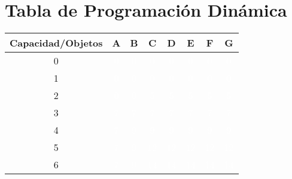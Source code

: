 \documentclass{article}
\begin{document}
\section*{Tabla de Programación Dinámica}
\begin{center}
\scriptsize
\begin{tabular}{|c|c|c|c|c|c|c|c|}
\hline
Capacidad/Objetos & A & B & C & D & E & F & G \\ \hline
0 & \cellcolor{rojo}\textcolor{white}{0} & \cellcolor{rojo}\textcolor{white}{0} & \cellcolor{rojo}\textcolor{white}{0} & \cellcolor{rojo}\textcolor{white}{0} & \cellcolor{rojo}\textcolor{white}{0} & \cellcolor{rojo}\textcolor{white}{0} & \cellcolor{rojo}\textcolor{white}{0} \\ \hline
1 & \cellcolor{rojo}\textcolor{white}{0} & \cellcolor{rojo}\textcolor{white}{0} & \cellcolor{rojo}\textcolor{white}{0} & \cellcolor{rojo}\textcolor{white}{0} & \cellcolor{rojo}\textcolor{white}{0} & \cellcolor{rojo}\textcolor{white}{0} & \cellcolor{rojo}\textcolor{white}{0} \\ \hline
2 & \cellcolor{rojo}\textcolor{white}{0} & \cellcolor{rojo}\textcolor{white}{0} & \cellcolor{verde}\textcolor{white}{5} & \cellcolor{rojo}\textcolor{white}{5} & \cellcolor{rojo}\textcolor{white}{5} & \cellcolor{rojo}\textcolor{white}{5} & \cellcolor{rojo}\textcolor{white}{5} \\ \hline
3 & \cellcolor{verde}\textcolor{white}{7} & \cellcolor{rojo}\textcolor{white}{7} & \cellcolor{rojo}\textcolor{white}{7} & \cellcolor{rojo}\textcolor{white}{7} & \cellcolor{rojo}\textcolor{white}{7} & \cellcolor{rojo}\textcolor{white}{7} & \cellcolor{rojo}\textcolor{white}{7} \\ \hline
4 & \cellcolor{verde}\textcolor{white}{7} & \cellcolor{verde}\textcolor{white}{9} & \cellcolor{rojo}\textcolor{white}{9} & \cellcolor{rojo}\textcolor{white}{9} & \cellcolor{rojo}\textcolor{white}{9} & \cellcolor{rojo}\textcolor{white}{9} & \cellcolor{rojo}\textcolor{white}{9} \\ \hline
5 & \cellcolor{verde}\textcolor{white}{7} & \cellcolor{verde}\textcolor{white}{9} & \cellcolor{verde}\textcolor{white}{12} & \cellcolor{rojo}\textcolor{white}{12} & \cellcolor{rojo}\textcolor{white}{12} & \cellcolor{rojo}\textcolor{white}{12} & \cellcolor{rojo}\textcolor{white}{12} \\ \hline
6 & \cellcolor{verde}\textcolor{white}{7} & \cellcolor{verde}\textcolor{white}{9} & \cellcolor{verde}\textcolor{white}{14} & \cellcolor{rojo}\textcolor{white}{14} & \cellcolor{rojo}\textcolor{white}{14} & \cellcolor{rojo}\textcolor{white}{14} & \cellcolor{rojo}\textcolor{white}{14} \\ \hline

\end{tabular}
\end{center}
\end{document}

